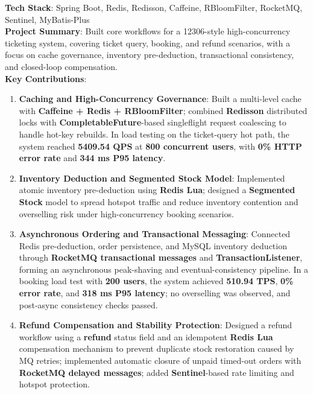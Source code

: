 \documentclass{resume}
\begin{document}
\textbf{Tech Stack}: Spring Boot, Redis, Redisson, Caffeine, RBloomFilter, RocketMQ, Sentinel, MyBatis-Plus\\
\textbf{Project Summary}: Built core workflows for a 12306-style high-concurrency ticketing system, covering ticket query, booking, and refund scenarios, with a focus on cache governance, inventory pre-deduction, transactional consistency, and closed-loop compensation.\\
\textbf{Key Contributions}:
\begin{enumerate}[parsep=0.5ex]
    \item \textbf{Caching and High-Concurrency Governance}: Built a multi-level cache with \textbf{Caffeine + Redis + RBloomFilter}; combined \textbf{Redisson} distributed locks with \textbf{CompletableFuture}-based singleflight request coalescing to handle hot-key rebuilds. In load testing on the ticket-query hot path, the system reached \textbf{5409.54 QPS} at \textbf{800 concurrent users}, with \textbf{0\% HTTP error rate} and \textbf{344 ms P95 latency}.
    \item \textbf{Inventory Deduction and Segmented Stock Model}: Implemented atomic inventory pre-deduction using \textbf{Redis Lua}; designed a \textbf{Segmented Stock} model to spread hotspot traffic and reduce inventory contention and overselling risk under high-concurrency booking scenarios.
    \item \textbf{Asynchronous Ordering and Transactional Messaging}: Connected Redis pre-deduction, order persistence, and MySQL inventory deduction through \textbf{RocketMQ transactional messages} and \textbf{TransactionListener}, forming an asynchronous peak-shaving and eventual-consistency pipeline. In a booking load test with \textbf{200 users}, the system achieved \textbf{510.94 TPS}, \textbf{0\% error rate}, and \textbf{318 ms P95 latency}; no overselling was observed, and post-async consistency checks passed.
    \item \textbf{Refund Compensation and Stability Protection}: Designed a refund workflow using a \textbf{refund} status field and an idempotent \textbf{Redis Lua} compensation mechanism to prevent duplicate stock restoration caused by MQ retries; implemented automatic closure of unpaid timed-out orders with \textbf{RocketMQ delayed messages}; added \textbf{Sentinel}-based rate limiting and hotspot protection.
\end{enumerate}
\end{document}
